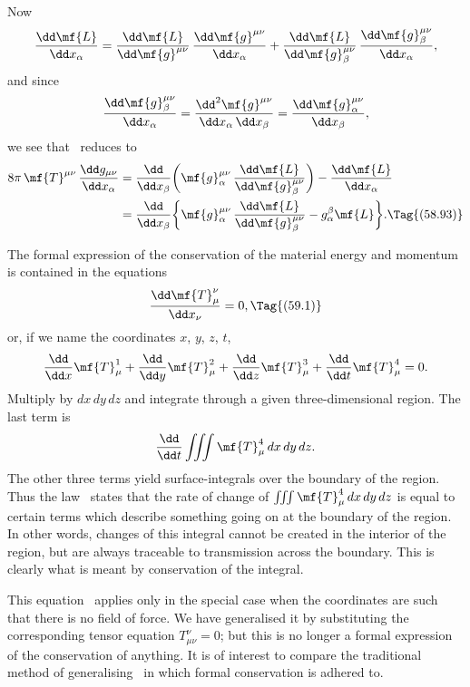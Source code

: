 \documentclass[12pt]{book}
\begin{document}
Now
\[
\frac{\dd\mf{L}}{\dd x_{\alpha}}
= \frac{\dd\mf{L}}{\dd\mf{g}^{\mu\nu}}\, \frac{\dd\mf{g}^{\mu\nu}}{\dd x_{\alpha}}
+ \frac{\dd\mf{L}}{\dd\mf{g}_{\beta}^{\mu\nu}}\, \frac{\dd\mf{g}_{\beta}^{\mu\nu}}{\dd x_{\alpha}},
\]
and since
\[
\frac{\dd\mf{g}_{\beta}^{\mu\nu}}{\dd x_{\alpha}}
= \frac{\dd^{2}\mf{g}^{\mu\nu}}{\dd x_{\alpha}\, \dd x_{\beta}}
= \frac{\dd\mf{g}_{\alpha}^{\mu\nu}}{\dd x_{\beta}},
\]
we see that ~reduces to
\begin{align*}
  8\pi\, \mf{T}^{\mu\nu}\, \frac{\dd g_{\mu\nu}}{\dd x_{\alpha}}
  &= \frac{\dd}{\dd x_{\beta}} \biggl(\mf{g}_{\alpha}^{\mu\nu}\, \frac{\dd\mf{L}}{\dd\mf{g}_{\beta}^{\mu\nu}}\biggr)
  - \frac{\dd\mf{L}}{\dd x_{\alpha}} \\
  &= \frac{\dd}{\dd x_{\beta}} \biggl\{\mf{g}_{\alpha}^{\mu\nu}\, \frac{\dd\mf{L}}{\dd\mf{g}_{\beta}^{\mu\nu}}
  - g_{\alpha}^{\beta}\mf{L}\biggr\}.
  \Tag{(58.93)}
\end{align*}


The formal expression of the conservation of the material energy and
%
momentum is contained in the equations
\[
\frac{\dd\mf{T}_{\mu}^{\nu}}{\dd x_{\nu}} = 0,
\Tag{(59.1)}
\]
or, if we name the coordinates $x$, $y$, $z$, $t$,
\[
\frac{\dd}{\dd x}\mf{T}_{\mu}^{1}
+ \frac{\dd}{\dd y}\mf{T}_{\mu}^{2}
+ \frac{\dd}{\dd z}\mf{T}_{\mu}^{3}
+ \frac{\dd}{\dd t}\mf{T}_{\mu}^{4} = 0.
\]
Multiply by $dx\, dy\, dz$ and integrate through a given three-dimensional region.
The last term is
\[
\frac{\dd}{\dd t} \iiint \mf{T}_{\mu}^{4}\, dx\, dy\, dz.
\]
The other three terms yield surface-integrals over the boundary of the region.
Thus the law~ states that the rate of change of $\iiint \mf{T}_{\mu}^{4}\, dx\, dy\, dz$ is equal to
certain terms which describe something going on at the boundary of the region.
In other words, changes of this integral cannot be created in the interior of
the region, but are always traceable to transmission across the boundary. This
is clearly what is meant by conservation of the integral.

This equation~ applies only in the special case when the coordinates
are such that there is no field of force. We have generalised it by substituting
the corresponding tensor equation $T_{\mu\nu}^{\nu} = 0$; but this is no longer a formal expression
of the conservation of anything. It is of interest to compare the
traditional method of generalising~ in which formal conservation is
adhered to.
\end{document}
